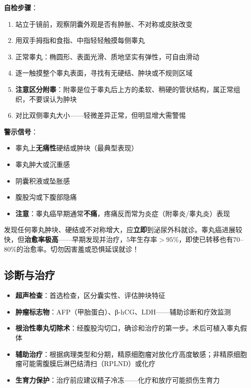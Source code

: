 \textbf{自检步骤}：
\begin{enumerate}
	\item 站立于镜前，观察阴囊外观是否有肿胀、不对称或皮肤改变
	\item 用双手拇指和食指、中指轻轻触摸每侧睾丸
	\item 正常睾丸：椭圆形、表面光滑、质地坚实有弹性，可自由滑动
	\item 逐一触摸整个睾丸表面，寻找有无硬结、肿块或不规则区域
	\item \textbf{注意区分附睾}：附睾是位于睾丸后上方的柔软、稍硬的管状结构，属正常组织，不要误认为肿块
	\item 对比双侧睾丸大小——轻微差异正常，但明显增大需警惕
\end{enumerate}

\textbf{警示信号}：
\begin{itemize}[leftmargin=2cm]
	\item 睾丸上\textbf{无痛性}硬结或肿块（最典型表现）
	\item 睾丸肿大或沉重感
	\item 阴囊积液或坠胀感
	\item 腹股沟或下腹部隐痛
	\item \textbf{注意}：睾丸癌早期通常\textbf{不痛}，疼痛反而常为炎症（附睾炎/睾丸炎）表现
\end{itemize}

\begin{tcolorbox}[colback=pink!5!white,colframe=red!50!black,title=贴心小叮咛]
发现任何睾丸肿块、硬结或不对称增大，应\textbf{立即}到泌尿外科就诊。睾丸癌进展较快，但\textbf{治愈率极高}——早期发现并治疗，5年生存率$>95\%$，即使已转移也有$70$--$80\%$的治愈率。切勿因害羞或恐惧延误就诊！
\end{tcolorbox}

\subsection{诊断与治疗}

\begin{itemize}[leftmargin=2cm]
	\item \textbf{超声检查}：首选检查，区分囊实性、评估肿块特征
	\item \textbf{肿瘤标志物}：AFP（甲胎蛋白）、β-hCG、LDH——辅助诊断和疗效监测
	\item \textbf{根治性睾丸切除术}：经腹股沟切口，确诊和治疗的第一步。术后可植入睾丸假体
	\item \textbf{辅助治疗}：根据病理类型和分期，精原细胞瘤对放化疗高度敏感；非精原细胞瘤可能需腹膜后淋巴结清扫（RPLND）或化疗
	\item \textbf{生育力保护}：治疗前应建议精子冷冻——化疗和放疗可能损伤生育力
\end{itemize}

